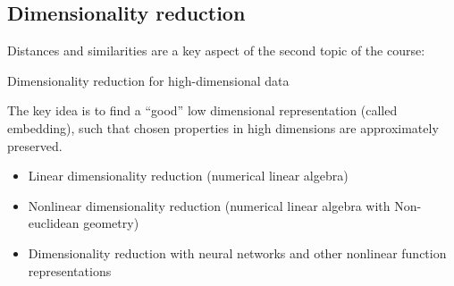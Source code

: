 \subsection{Dimensionality reduction}

Distances and similarities are a key aspect of the second topic of the course:
\begin{center}
    Dimensionality reduction for high-dimensional data
\end{center}

The key idea is to find a ``good'' low dimensional representation (called embedding),
such that chosen properties in high dimensions are approximately preserved.

\begin{itemize}
    \item Linear dimensionality reduction (numerical linear algebra)
    \item Nonlinear dimensionality reduction (numerical linear algebra with Non-euclidean geometry)
    \item Dimensionality reduction with neural networks and other nonlinear function representations 
\end{itemize}